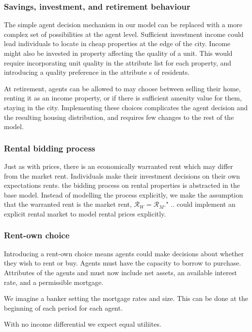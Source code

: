 \subsubsection{Savings, investment, and retirement behaviour}
The simple agent decision mechanism %
in our model can be replaced with a more complex set of possibilities at the agent level. Sufficient investment income could lead individuals to locate in cheap properties at the edge of the city.  Income might also be invested in property affecting the quality of a unit. This would require incorporating unit quality in the attribute list for each property, and introducing a quality preference  in the attribute s of residents.

At retirement,  agents can be allowed to may choose between selling their home, renting it as an income property, or if there is sufficient amenity value for them, staying in the city. Implementing these choices complicates the agent decision and the resulting housing distribution, and requires few changes to the rest of the model. 

\subsubsection{Rental bidding process}
Just as with prices, there is an economically \gls{warranted rent} which may differ from the \gls{market rent}. Individuals make their investment decisions on their own expectations rents. the bidding process on rental properties is abstracted in the base model. Instead of modelling the process explicitly, we make the assumption that the warranted rent is the market rent, $\mathcal{R}_W = \mathcal{R}_M$." .. could implement an explicit rental market to model rental prices explicitly.

\subsubsection{Rent-own choice}
Introducing a rent-own choice means agents could make decisions about whether they wish to rent or buy. %
Agents must have the capacity to borrow to purchase. Attributes of the agents and must now include  net assets,  an available interest rate, and a permissible mortgage.

We imagine a banker setting the mortgage rates and size. This can be done at the beginning of each period for each agent. 

With no income differential we expect equal utiliites.

